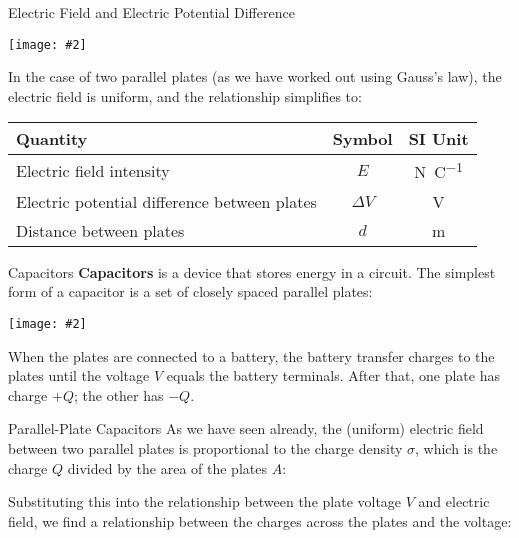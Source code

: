 \documentclass[12pt,aspectratio=169]{beamer}
\newcommand{\pic}[2]{\texttt{[image: \#2]}}
\newcommand{\eq}[2]{\vspace{#1}{\Large\begin{displaymath}#2\end{displaymath}}}
\begin{document}
\begin{frame}{Electric Field and Electric Potential Difference}
  \begin{center}
    \pic{.5}{elfield-600x205}
  \end{center}
  \vspace{-.15in}In the case of two parallel plates (as we have worked out using
  Gauss's law), the electric field is uniform, and the relationship simplifies
  to:

  \eq{-.2in}{
    \boxed{E=\frac{\Delta V}{d}}
    \quad\text{or}\quad
    \boxed{\Delta V=Ed}
  }
  \begin{center}
    \begin{tabular}{l|c|c}
      \rowcolor{pink}
      \textbf{Quantity} & \textbf{Symbol} & \textbf{SI Unit} \\ \hline
      Electric field intensity & $E$ & \si{\newton\per\coulomb}\\
      Electric potential difference between plates & $\Delta V$ &
      \si{\volt} \\
      Distance between plates       & $d$ & \si{\metre}
    \end{tabular}
  \end{center}
\end{frame}



\begin{frame}{Capacitors}
  \textbf{Capacitors} is a device that stores energy in a circuit. The simplest
  form of a capacitor is a set of closely spaced parallel plates:
  \begin{center}
    \pic{.5}{cap19}
  \end{center}
  When the plates are connected to a battery, the battery transfer charges to
  the plates until the voltage $V$ equals the battery terminals. After that,
  one plate has charge $+Q$; the other has $-Q$.
\end{frame}



\begin{frame}{Parallel-Plate Capacitors}
  As we have seen already, the (uniform) electric field between two parallel
  plates is proportional to the charge density $\sigma$, which is the charge
  $Q$ divided by the area of the plates $A$:

  \eq{-.2in}{
    E=\frac{\textcolor{red}{\sigma}}{\epsilon_0}=
    \frac{\textcolor{red}{Q}}{\textcolor{red}{A}\epsilon_0}
  }
  
  Substituting this into the relationship between the plate voltage $V$ and
  electric field, we find a relationship between the charges across the plates
  and the voltage:

  \eq{-.2in}{
    V=\textcolor{blue}{E}d=
    \frac{\textcolor{blue}{Q}d}{\textcolor{blue}{A\epsilon_0}}
    \quad\longrightarrow\quad
    \boxed{Q=\left[\frac{A\epsilon_0}{d}\right]V}
  }
\end{frame}
\end{document}
